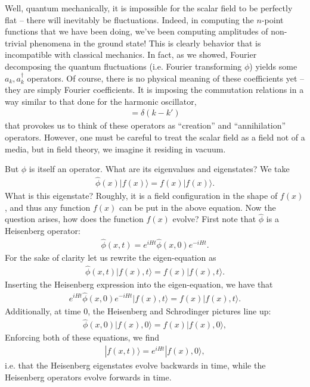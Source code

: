 \documentclass{../mathnotes}
\begin{document}
Well, quantum mechanically, it is impossible for the scalar field to be perfectly flat -- there will inevitably be fluctuations. Indeed, in computing
the $n$-point functions that we have been doing, we've been computing amplitudes of non-trivial phenomena in the ground state! This is clearly behavior that
is incompatible with classical mechanics. In fact, as we showed, Fourier decomposing the quantum fluctuations (i.e. Fourier transforming $\phi$) yields some
$a_k,a_k^\dagger$ operators. Of course, there is no physical meaning of these coefficients yet -- they are simply Fourier coefficients. It is imposing the
commutation relations in a way similar to that done for the harmonic oscillator,
\begin{align*}
    [a_k,a^\dagger_{k'}]=\delta(k-k')
\end{align*}
that provokes us to think of these operators as ``creation'' and ``annihilation'' operators. However, one must be careful to treat the scalar field as a field
not of a media, but in field theory, we imagine it residing in vacuum.

But $\phi$ is itself an operator. What are its eigenvalues and eigenstates? We take
\begin{align*}
    \hat{\phi}(x)|f(x)\rangle=f(x)|f(x)\rangle.
\end{align*}
What is this eigenstate? Roughly, it is a field configuration in the shape of $f(x)$, and thus any function $f(x)$ can be put in the above equation.
Now the question arises, how does the function $f(x)$ evolve? First note that $\hat{\phi}$ is a Heisenberg operator:
\begin{align*}
    \hat{\phi}(x,t)=e^{iHt}\hat{\phi}(x,0)e^{-iHt}.
\end{align*}
For the sake of clarity let us rewrite the eigen-equation as
\begin{align*}
    \hat{\phi}(x,t)|f(x),t\rangle=f(x)|f(x),t\rangle.
\end{align*}
Inserting the Heisenberg expression into the eigen-equation, we have that
\begin{align*}
    e^{iHt}\hat{\phi}(x,0)e^{-iHt}|f(x),t\rangle=f(x)|f(x),t\rangle.
\end{align*}
Additionally, at time 0, the Heisenberg and Schrodinger pictures line up:
\begin{align*}
    \hat{\phi}(x,0)|f(x),0\rangle=f(x)|f(x),0\rangle,
\end{align*}
Enforcing both of these equations, we find
\begin{align*}
    |f(x,t)\rangle=e^{iHt}|f(x),0\rangle,
\end{align*}
i.e. that the Heisenberg eigenstates evolve backwards in time, while the Heisenberg operators evolve forwards in time.
\end{document}
